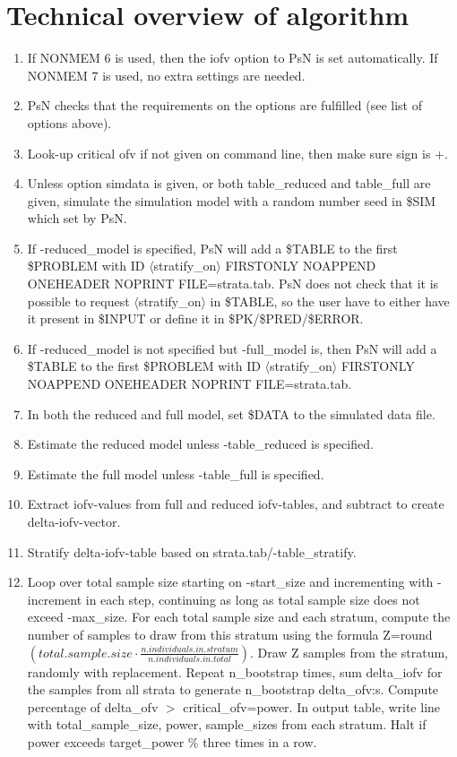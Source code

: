\section{Technical overview of algorithm}

\begin{enumerate}
\item If NONMEM 6 is used, then the iofv option to PsN is set automatically. If NONMEM 7 is used, no extra settings are needed.
\item PsN checks that the requirements on the options are fulfilled (see list of options above).
\item Look-up critical ofv if not given on command line, then make sure sign is +.
\item Unless option simdata is given, or both table\_reduced and table\_full are given, simulate the simulation model with a random number seed in \$SIM which set by PsN.
\item If -reduced\_model is specified, PsN will add a \$TABLE to the first \$PROBLEM with ID $\langle$stratify\_on$\rangle$ FIRSTONLY NOAPPEND ONEHEADER NOPRINT FILE=strata.tab. PsN does not check that it is possible to request $\langle$stratify\_on$\rangle$ in \$TABLE, so the user have to either have it present in \$INPUT or define it in \$PK/\$PRED/\$ERROR.
\newpage
\item If -reduced\_model is not specified but -full\_model is, then  PsN will add a \$TABLE to the first \$PROBLEM with ID $\langle$stratify\_on$\rangle$ FIRSTONLY NOAPPEND ONEHEADER NOPRINT FILE=strata.tab.
\item In both the reduced and full model, set \$DATA to the simulated data file.
\item Estimate the reduced model unless -table\_reduced is specified.
\item Estimate the full model unless -table\_full is specified.
\item Extract iofv-values from full and reduced iofv-tables, and subtract to create delta-iofv-vector.
\item Stratify delta-iofv-table based on strata.tab/-table\_stratify.
\item Loop over total sample size starting on -start\_size and incrementing with -increment in each step, continuing as long as total sample size does not exceed -max\_size. For each total sample size and each stratum, compute the number of samples to draw from this stratum using the formula
Z=round\begin{math}
(total.sample.size\cdot\frac{n.individuals.in.stratum}{n.individuals.in.total}).
\end{math}
Draw Z samples from the stratum, randomly with replacement. Repeat n\_bootstrap times, sum delta\_iofv for the samples from all strata to generate n\_bootstrap delta\_ofv:s. Compute percentage of delta\_ofv $>$ critical\_ofv=power. In output table, write line with total\_sample\_size, power, sample\_sizes from each stratum. Halt if power exceeds target\_power \% three times in a row.
\end{enumerate}



